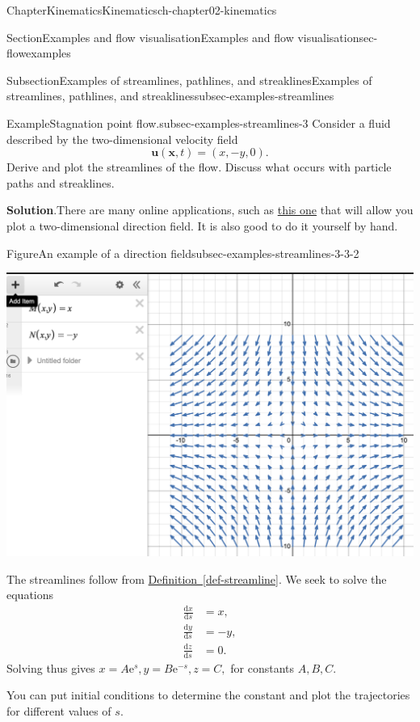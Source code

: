 \documentclass[oneside,10pt,]{book}
\newcommand{\blocktitlefont}{\relax}
\newcommand{\xreffont}{\relax}
\numberwithin{equation}{section}
\newcommand{\e}{\mathrm{e}}
\newcommand{\de}{\mathrm{d}}
\newcommand{\dd}[2]{\frac{\de#1}{\de#2}}
\newcommand{\bx}{\boldsymbol{x}}
\newcommand{\bu}{\boldsymbol{u}}
\begin{document}
\begin{chapterptx}{Chapter}{Kinematics}{}{Kinematics}{}{}{ch-chapter02-kinematics}
\begin{sectionptx}{Section}{Examples and flow visualisation}{}{Examples and flow visualisation}{}{}{sec-flowexamples}
\begin{subsectionptx}{Subsection}{Examples of streamlines, pathlines, and streaklines}{}{Examples of streamlines, pathlines, and streaklines}{}{}{subsec-examples-streamlines}
\begin{example}{Example}{Stagnation point flow.}{subsec-examples-streamlines-3}
Consider a fluid described by the two-dimensional velocity field%
\begin{equation*}
\bu(\bx, t) = (x, -y, 0).
\end{equation*}
Derive and plot the streamlines of the flow. Discuss what occurs with particle paths and streaklines.%
\par\smallskip%
\noindent\textbf{\blocktitlefont Solution}.\hypertarget{subsec-examples-streamlines-3-3}{}\quad{}There are many online applications, such as \href{https://www.desmos.com/calculator/yhubcn7dij}{this one} that will allow you plot a two-dimensional direction field. It is also good to do it yourself by hand.%
\begin{figureptx}{Figure}{An example of a direction field}{subsec-examples-streamlines-3-3-2}{}%
\begin{image}{0.05}{0.9}{0.05}{}%
\includegraphics[width=\linewidth]{external/directionfieldexample.png}
\end{image}%
\tcblower
\end{figureptx}%
The streamlines follow from \hyperref[def-streamline]{Definition~{\xreffont\ref{def-streamline}}}. We seek to solve the equations%
\begin{align*}
\dd{x}{s} &= x, \\
\dd{y}{s} &= -y, \\
\dd{z}{s} &= 0. 
\end{align*}
Solving thus gives \(x = A \e^s, y = B\e^{-s}, z = C,\) for constants \(A, B, C\).%
\par
You can put initial conditions to determine the constant and plot the trajectories for different values of \(s\).%
\par

\end{example}
\end{subsectionptx}
\end{sectionptx}
\end{chapterptx}
\end{document}
